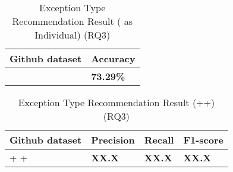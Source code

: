\begin{table}[t]%
  \caption{Exception Type Recommendation Result ({\xtype} as Individual) (RQ3)}
  \vspace{-12pt}
  \small
	\begin{center}
		\renewcommand{\arraystretch}{1}
		\begin{tabular}{| p{3.05cm}<{\centering} | p{1.2cm}<{\centering}|}
		  \hline
			Github dataset  & Accuracy \\
			\hline
			\xtype   & \textbf{73.29\%} \\
			\hline
		\end{tabular}
		\label{tab:xtype-3}
	\end{center}
\end{table}

\begin{table}[t]%
  \caption{Exception Type Recommendation Result (\xblock+\xstate+\xtype) (RQ3)}
  \vspace{-12pt}
  \small
	\begin{center}
		\renewcommand{\arraystretch}{1}
		\begin{tabular}{| p{3.10cm}<{\centering} | p{1.2cm}<{\centering} | p{1.2cm}<{\centering}| p{1.2cm}<{\centering}|}
		  \hline
			Github dataset  & Precision  & Recall & F1-score \\
			\hline
			\xblock + \xstate  + \xtype  & \textbf{XX.X}  &  \textbf{XX.X} & \textbf{XX.X}\\
			\hline
		\end{tabular}
		\label{tab:xtype-4}
	\end{center}

\end{table}
